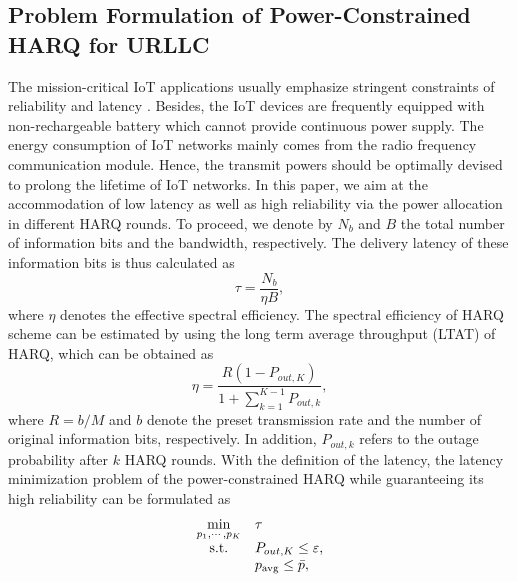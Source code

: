\documentclass[conference]{IEEEtran}
\begin{document}
\subsection{Problem Formulation of Power-Constrained HARQ for URLLC}
The mission-critical IoT applications usually emphasize stringent constraints of reliability and latency \cite{9810267}. Besides, the IoT devices  are frequently equipped with non-rechargeable battery which cannot provide continuous power supply. The energy consumption of IoT networks mainly comes from the radio frequency communication module. Hence, the transmit powers should be optimally devised to prolong the lifetime of IoT networks. In this paper, we aim at the accommodation of low latency as well as high reliability via the power allocation in different HARQ rounds. To proceed, we denote by $N_b$ and $B$ the total number of information bits and the bandwidth, respectively. The delivery latency of these information bits is thus calculated as
\begin{equation}\label{eqn:delay_def}
\tau = \frac{N_b}{\eta B},
\end{equation}
where $\eta$ denotes the effective spectral efficiency. The spectral efficiency of HARQ scheme can be estimated by using the long term average throughput (LTAT) of HARQ, which can be obtained as \cite{6879267}
\begin{equation}\label{eqn:throught2}
\eta  = \frac{{R(1 - {P_{out,K}})}}{{1 + \sum\limits_{k=1}^{K - 1} {{P_{out,k}}} }},
\end{equation}
where $R = b/M$ and $b$ denote the preset transmission rate  and the number of original information bits, respectively. In addition, $P_{out,k}$ refers to the outage probability after $k$ HARQ rounds. With the definition of the latency, the latency minimization problem of the power-constrained HARQ while guaranteeing its high reliability can be formulated as
\begin{equation}\label{eqn:min_delay}
\begin{array}{*{20}{cl}}
{\mathop {\min }\limits_{{p_1}, \cdots ,{p_K}} }&\tau \\
{\rm s.t.}&{{P_{out,K}} \le \varepsilon },\\
{}&{p_{\rm avg} \le \bar p,}
\end{array}
\end{equation}
\end{document}
